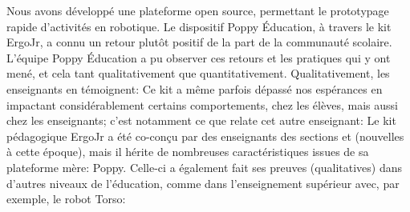 Nous avons développé une plateforme open source, permettant le prototypage rapide d'activités  en robotique. Le dispositif Poppy Éducation, à travers le kit ErgoJr, a connu un retour plutôt positif de la part de la communauté scolaire.
L'équipe Poppy Éducation a pu observer ces retours et les pratiques qui y ont mené, et cela tant qualitativement que quantitativement. Qualitativement, les enseignants en témoignent:
Ce kit a même parfois dépassé nos espérances  en impactant considérablement certains comportements, chez les élèves, mais aussi chez les enseignants; c'est notamment ce que relate cet autre enseignant:
Le kit pédagogique ErgoJr a été co-conçu par des enseignants des sections  et  (nouvelles à cette époque), mais il hérite de nombreuses caractéristiques issues de sa plateforme mère: Poppy. Celle-ci a également fait ses preuves (qualitatives) dans d'autres niveaux de l'éducation, comme dans l'enseignement supérieur avec, par exemple, le robot Torso:

